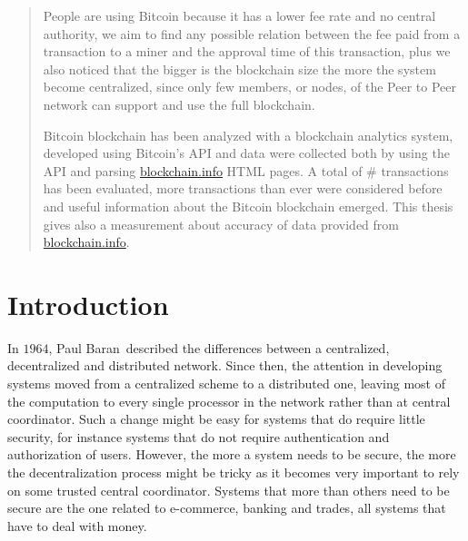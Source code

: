 \documentclass[USenglish]{uit-thesis}
\begin{document}
\begin{abstract}
People are using Bitcoin because 
it has a lower fee rate and no central authority, we aim to find any
possible relation between the fee paid from a transaction to a
miner and the approval time of this transaction, plus we also noticed that
the bigger is the blockchain size the more the system become
centralized, since only few members, or nodes, of the Peer to Peer network can
support and use the full blockchain.

Bitcoin blockchain has been analyzed with a blockchain analytics system,
developed using Bitcoin's API and data were collected both by using the
API and parsing \url{blockchain.info} HTML pages.
A total of \# transactions has been evaluated, more transactions than ever were
considered before and useful information about the Bitcoin blockchain emerged.
This thesis gives also a measurement about accuracy of data
provided from \url{blockchain.info}.
\end{abstract}

%

\tableofcontents

\listofdefinition

\mainmatter
\chapter{Introduction}
\label{chap:introduction}



In $1964$, Paul Baran\,\cite{Baran1964:ODC}
described the differences
between a centralized, decentralized and distributed
network. Since then, the attention
in developing systems moved from a centralized scheme to a distributed one,
leaving most of the computation to every single processor in the network
rather than at central coordinator.
Such a change might be easy for systems that do require little
security, for instance systems that do not require authentication
and authorization of users.
However, the more a system needs to be secure, the more the decentralization
process might be tricky as it becomes very important to rely on
some trusted central coordinator. Systems that more than others need
to be secure are the one related to e-commerce, banking and trades, all
systems that have to deal with money.
\end{document}
